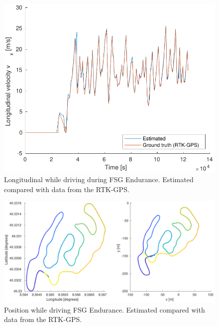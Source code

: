 \begin{figure}
    \centering
    \includegraphics[width=0.8\linewidth]{0_Images/6_Results/vxFSGEndurance.pdf}
    \caption[Longitudinal velocity while driving FSG Endurance.]
    {Longitudinal while driving  during FSG Endurance. Estimated compared with data from the RTK-GPS.}
    \label{Fig:VxFSGEndurance}
\end{figure}

\begin{figure}
    \centering
    \includegraphics[width=0.8\linewidth]{0_Images/6_Results/positionFSGEndurance.pdf}
    \caption[Position while driving FSG Endurance.]
    {Position while driving FSG Endurance. Estimated compared with data from the RTK-GPS.}
    \label{Fig:PosFSGEndurance}
\end{figure}

